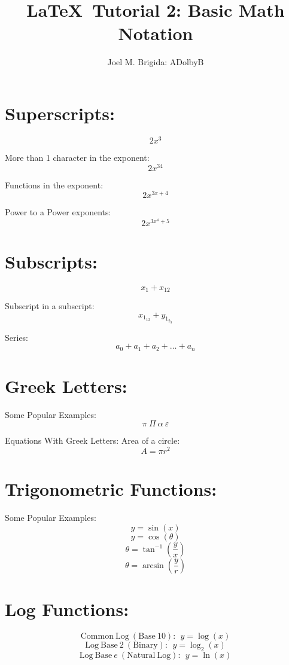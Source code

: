 \documentclass[11pt]{article} %
\begin{document}
\title{\LaTeX\ Tutorial 2: Basic Math Notation}
\author{Joel M. Brigida: ADolbyB}
\maketitle %

\section{Superscripts:}
\thispagestyle{empty} %

$$2x^3$$

\noindent
More than 1 character in the exponent: $$2x^{34}$$

\noindent
Functions in the exponent: $$2x^{3x+4}$$

\noindent
Power to a Power exponents: $$2x^{3x^{4}+5}$$

\section{Subscripts:}

$$x_1 + x_{12}$$

\noindent
Subscript in a subscript: $$x_{1_{12}} + y_{1_{2_{3}}}$$

\noindent
Series: $$a_0 + a_1 + a_2 + \ldots + a_n$$

\section{Greek Letters:}

\noindent
Some Popular Examples: $$\pi \ \Pi \ \alpha \ \varepsilon $$

\noindent
Equations With Greek Letters: Area of a circle:$$A = \pi r^{2}$$

\section{Trigonometric Functions:}

\noindent
Some Popular Examples: $$y = \sin(x) $$
$$y = \cos(\theta)$$
$$\theta = \tan^{-1} \left( \frac{y}{x} \right) $$
$$\theta = \arcsin \left( \frac{y}{r} \right) $$

\section{Log Functions:}

$$ \mathrm{Common \ Log \ (Base \ 10): \ \ } y = \log (x) $$
$$ \mathrm{Log \ Base \ 2 \ (Binary): \ \ } y = \log_{2}(x) $$
$$ \mathrm{Log \ Base \ } e \mathrm{\ (Natural \ Log): \ \ } y = \ln (x) $$
\end{document}
